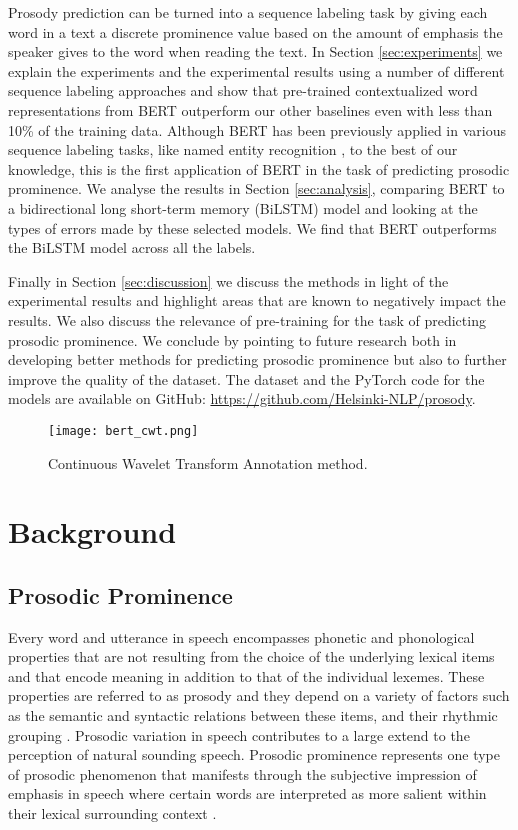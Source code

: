 \documentclass[11pt]{article}
\begin{document}
Prosody prediction can be turned into a sequence labeling task by giving each word in a text a discrete prominence value based on the amount of emphasis the speaker gives to the word when reading the text. In Section \ref{sec:experiments} we explain the experiments and the experimental results using a number of different sequence labeling approaches and show that pre-trained contextualized word representations from BERT \cite{devlin2019bert} outperform our other baselines even with less than 10\% of the training data.
Although BERT has been previously applied in various sequence labeling tasks, like named entity recognition \cite{devlin2019bert}, to the best of our knowledge, this is the first application of BERT in the task of predicting prosodic prominence. We analyse the results in Section \ref{sec:analysis}, comparing BERT to a bidirectional long short-term memory (BiLSTM) model and looking at the types of errors made by these selected models. We find that BERT outperforms the BiLSTM model across all the labels. 

Finally in Section \ref{sec:discussion} we discuss the methods in light of the experimental results and highlight areas that are known to negatively impact the results. We also discuss the relevance of pre-training for the task of predicting prosodic prominence.
We conclude by pointing to future research both in developing better methods for predicting prosodic prominence but also to further improve the quality of the dataset. The dataset and the PyTorch code for the models are available on GitHub: \url{https://github.com/Helsinki-NLP/prosody}.





\begin{figure*}[ht!]
\centering
\texttt{[image: bert\_cwt.png]}
  \caption{Continuous Wavelet Transform Annotation method.}
    \label{fig:cwt_pic}
\end{figure*}

\section{Background} \label{sec:background}
\subsection{Prosodic Prominence}
Every word and utterance in speech encompasses phonetic and phonological properties that are not resulting from the choice of the underlying lexical items and that encode meaning in addition to that of the individual lexemes. These properties are referred to as prosody and they depend on a variety of factors such as the semantic and syntactic relations between these items, and their rhythmic grouping \cite{wagner2010experimental}. Prosodic variation in speech contributes to a large extend to the perception of natural sounding speech. Prosodic prominence represents one type of prosodic phenomenon that manifests through the subjective impression of emphasis in speech where certain words are interpreted as more salient within their lexical surrounding context \cite{wagner2010experimental,terken2000perception}. 
\end{document}
